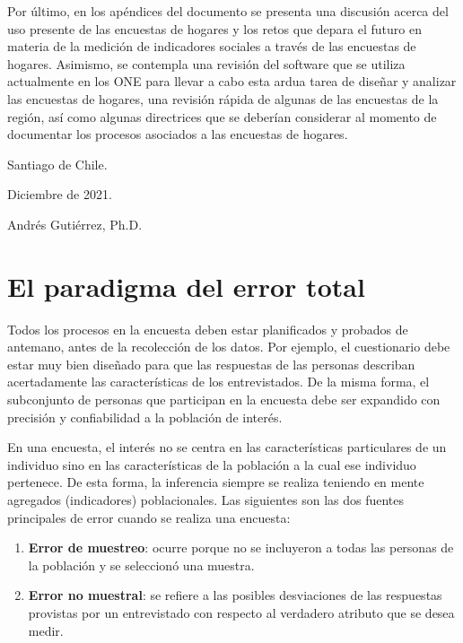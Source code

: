 \documentclass[
  12pt,
  spanish,
]{book}
\providecommand{\tightlist}{%
  \setlength{\itemsep}{0pt}\setlength{\parskip}{0pt}}
\begin{document}
Por último, en los apéndices del documento se presenta una discusión acerca del uso presente de las encuestas de hogares y los retos que depara el futuro en materia de la medición de indicadores sociales a través de las encuestas de hogares. Asimismo, se contempla una revisión del software que se utiliza actualmente en los ONE para llevar a cabo esta ardua tarea de diseñar y analizar las encuestas de hogares, una revisión rápida de algunas de las encuestas de la región, así como algunas directrices que se deberían considerar al momento de documentar los procesos asociados a las encuestas de hogares.

Santiago de Chile.

Diciembre de 2021.

Andrés Gutiérrez, Ph.D.~

\hypertarget{el-paradigma-del-error-total}{%
\chapter{El paradigma del error total}\label{el-paradigma-del-error-total}}

Todos los procesos en la encuesta deben estar planificados y probados de antemano, antes de la recolección de los datos. Por ejemplo, el cuestionario debe estar muy bien diseñado para que las respuestas de las personas describan acertadamente las características de los entrevistados. De la misma forma, el subconjunto de personas que participan en la encuesta debe ser expandido con precisión y confiabilidad a la población de interés.

En una encuesta, el interés no se centra en las características particulares de un individuo sino en las características de la población a la cual ese individuo pertenece. De esta forma, la inferencia siempre se realiza teniendo en mente agregados (indicadores) poblacionales. Las siguientes son las dos fuentes principales de error cuando se realiza una encuesta:

\begin{enumerate}
\def\labelenumi{\arabic{enumi}.}
\tightlist
\item
  \textbf{Error de muestreo}: ocurre porque no se incluyeron a todas las personas de la población y se seleccionó una muestra.
\item
  \textbf{Error no muestral}: se refiere a las posibles desviaciones de las respuestas provistas por un entrevistado con respecto al verdadero atributo que se desea medir.
\end{enumerate}
\end{document}
